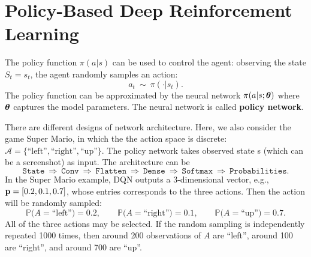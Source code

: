 \documentclass[11pt]{article}
\numberwithin{equation}{section}
\def\pp{{\bf p}}
\def\AM{{\mathcal A}}
\def\PB{{\mathbb P}}
\def\tha{\mbox{\boldmath$\theta$\unboldmath}}
\begin{document}
\section{Policy-Based Deep Reinforcement Learning} \label{sec:policy}



The policy function $\pi  (a | s)$ can be used to control the agent: observing the state $S_t = s_t$, the agent randomly samples an action: 
\begin{equation*}
    a_t  \: \sim \:  \pi (\cdot | s_t ) .
\end{equation*}
The policy function can be approximated by the neural network $\pi (a | s; \tha )$ where $\tha$ captures the model parameters.
The neural network is called \textbf{policy network}.




There are different designs of network architecture.
Here, we also consider the game Super Mario, in which the the action space is discrete: $\AM = \{ \textrm{``left''} , \textrm{``right''}, \textrm{``up''}\}$.
The policy network takes observed state s (which can be a screenshot) as input.
The architecture can be 
\begin{equation*}
    \texttt{State} 
    \: \Rightarrow \: 
    \texttt{Conv}
    \: \Rightarrow \: 
    \texttt{Flatten}
    \: \Rightarrow \: 
    \texttt{Dense} 
    \: \Rightarrow \: 
    \texttt{Softmax}
    \: \Rightarrow \: 
    \texttt{Probabilities} .
\end{equation*}
In the Super Mario example, DQN outputs a 3-dimensional vector, e.g., $\pp = [0.2, 0.1, 0.7]$, whose entries corresponds to the three actions.
Then the action will be randomly sampled:
\begin{equation*}
    \PB \big( A = \textrm{``left''} \big) = 0.2, \qquad
    \PB \big( A = \textrm{``right''} \big) = 0.1, \qquad
    \PB \big( A = \textrm{``up''} \big) = 0.7.
\end{equation*}
All of the three actions may be selected.
If the random sampling is independently repeated 1000 times, then around 200 observations of $A$ are ``left'', around 100 are ``right'', and around 700 are ``up''.
\end{document}
